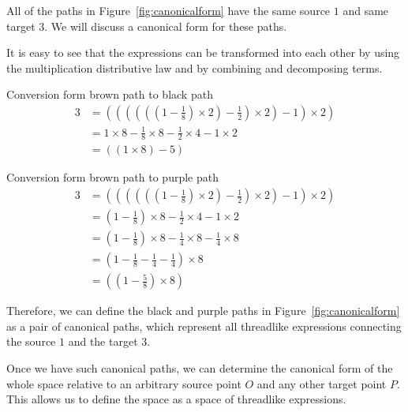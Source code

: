 All of the paths in Figure~\ref{fig:canonicalform} have the same source $1$ and same target $3$.
We will discuss a canonical form for these paths.

It is easy to see that the expressions can be transformed into each other by using the multiplication distributive law and by combining and decomposing terms.

Conversion form brown path to black path
\begin{align}
3 & = ((((((1 - \frac{1}{8}) \times 2) - \frac{1}{2}) \times 2) - 1) \times 2) \\
& = 1 \times 8 -  \frac{1}{8} \times 8 - \frac{1}{2} \times 4 - 1 \times 2 \\
& = ((1 \times 8) - 5)
\end{align}

Conversion form brown path to purple path
\begin{align}
3 & = ((((((1 - \frac{1}{8}) \times 2) - \frac{1}{2}) \times 2) - 1) \times 2) \\
& = (1 - \frac{1}{8}) \times 8 - \frac{1}{2} \times 4 - 1 \times 2 \\
& = (1 - \frac{1}{8}) \times 8 - \frac{1}{4} \times 8 -  \frac{1}{4} \times 8 \\
& = (1 - \frac{1}{8} - \frac{1}{4} - \frac{1}{4}) \times 8 \\
& = ((1 - \frac{5}{8}) \times 8)
\end{align}

Therefore, we can define the black and purple paths in Figure~\ref{fig:canonicalform} as a pair of canonical paths,
which represent all threadlike expressions connecting the source $1$ and the target $3$.

Once we have such canonical paths, we can determine the canonical form of the whole space relative to an arbitrary source point $O$ and any other target point $P$.
This allows us to define the space as a space of threadlike expressions.
